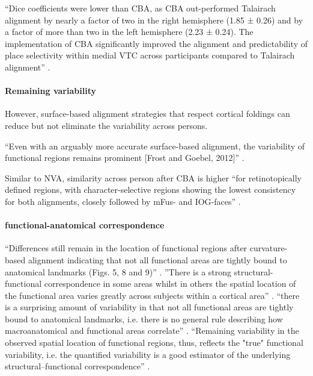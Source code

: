 ``Dice coefficients were lower than CBA, as CBA out-performed Talairach
alignment by nearly a factor of two in the right hemisphere (1.85 ± 0.26) and by
a factor of more than two in the left hemisphere (2.23 ± 0.24).
%
The implementation of CBA significantly improved the alignment and
predictability of place selectivity within medial VTC across participants
compared to Talairach alignment'' \citep{weiner2018defining}.


\paragraph{Remaining variability}
%
However, surface-based alignment strategies that respect cortical foldings
\citep{fischl2012freesurfer, yeo2009spherical} can reduce but not eliminate
\citep[e.g.,][]{coalson2018impact, benson2014correction, natu2021sulcal,
wang2015probabilistic, frost2012measuring, langers2014assessment, weiner2014mid,
rosenke2021probabilistic} the variability across persons.

``Even with an arguably more accurate surface-based alignment, the variability
of functional regions remains prominent  [Frost and Goebel, 2012]''
\citep{zhen2015quantifying}.

Similar to NVA, similarity across person after CBA is higher ``for
retinotopically defined regions, with character-selective regions showing the
lowest consistency for both alignments, closely followed by mFus- and
IOG-faces'' \citep{rosenke2021probabilistic}.


\paragraph{functional-anatomical correspondence}
%
``Differences still remain in the location of functional regions after
curvature-based alignment indicating that not all functional areas are tightly
bound to anatomical landmarks (Figs. 5, 8 and 9)'' \citep{frost2012measuring}.
%
''There is a strong structural-functional correspondence in some areas whilst in
others the spatial location of the functional area varies greatly across
subjects within a cortical area'' \citep{frost2012measuring}.
%
``there is a surprising amount of variability in that not all
functional areas are tightly bound to anatomical landmarks, i.e. there is no
general rule describing how macroanatomical and functional areas correlate''
\citep{frost2012measuring}.
%
``Remaining variability in the observed spatial location of functional regions,
thus, reflects the "true" functional variability, i.e. the quantified
variability is a good estimator of the underlying structural–functional
correspondence'' \citep{frost2012measuring}.

